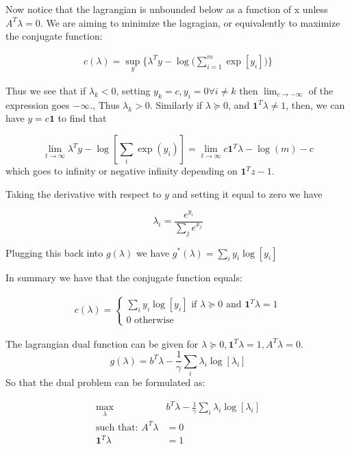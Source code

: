 \documentclass{article} %
\newcommand{\B}[1]{\mathbf{#1}}
\begin{document}
\begin{itemize}
Now notice that the lagrangian is unbounded below as a function of x unless $A^{T} \lambda =0$. We are aiming to minimize the lagragian,
or equivalently to maximize the conjugate function:

\begin{gather*}
c(\lambda) = \sup_{y}\{ \lambda^Ty - \log \big(  \sum_{i=1}^{m} \exp[y_i] \big) \}
\end{gather*}

Thus we see that if $\lambda_k < 0$, setting $y_k = c, y_i = 0 \forall i \neq k$ then $\lim_{c \to - \infty}$ of the expression goes $- \infty.$, Thus $\lambda_k > 0$. Similarly if $\lambda \succeq 0$, and $\B{1}^T \lambda \neq 1$, then, we can have $y = c \B{1}$ to find that

\[
\lim_{t \to \infty} \lambda^{T}y - \log[\sum_{i} \exp(y_i)] = \lim_{t \to \infty} c \B{1}^{T} \lambda - \log(m) - c
\]
which goes to infinity or negative infinity depending on $\B{1}^T z - 1$. 

Taking the derivative with respect to $y$ and setting it equal to zero we have

\[
\lambda_i = \frac{e^{y_i}}{ \sum_{j} e^{x_j}}
\]

Plugging this back into $g(\lambda)$ we have $g^*(\lambda) = \sum_{i} y_i \log[y_i]$

In summary we have that the conjugate function equals:

\begin{gather*}
c(\lambda) = \begin{cases}\sum_{i} y_i \log[y_i] \mbox{  if } \lambda \succeq 0 \mbox{ and } \B{1}^T \lambda = 1 \\ 
0 \mbox{ otherwise } \end{cases}
\end{gather*}

The lagrangian dual function can be given for $\lambda \succeq  0, \B{1}^{T}\lambda = 1, A^{T}\lambda = 0$. 
\[
g(\lambda) = b^{T} \lambda - \frac{1}{\gamma}\sum_{i} \lambda_i \log[\lambda_i]
\]
So that the dual problem can be formulated as:

\begin{equation*}
\begin{aligned}
\max_{\lambda} \quad & b^T \lambda - \frac{1}{\gamma} \sum_{i} \lambda_i \log[\lambda_i] \\ 
\mbox{such that: }  A^{T} \lambda &= 0 \\ 
\B{1}^{T}\lambda &= 1 \\ 
\end{aligned}
\end{equation*}


\end{itemize}
\end{document}

